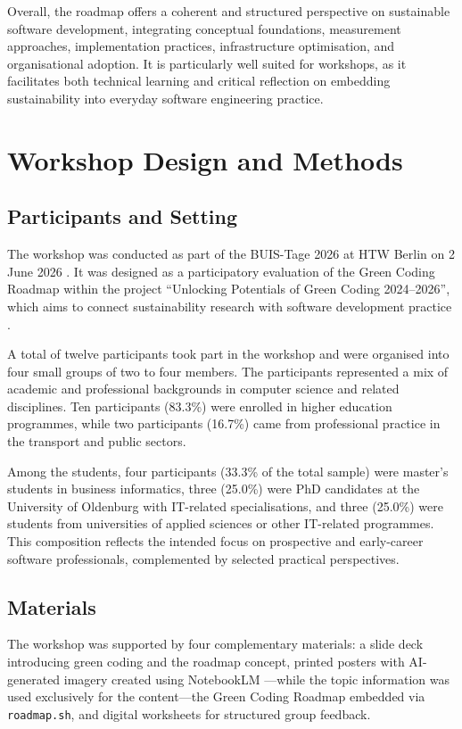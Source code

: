 \documentclass[english]{lni}
\begin{document}
Overall, the roadmap offers a coherent and structured perspective on sustainable software development, integrating conceptual foundations, measurement approaches, implementation practices, infrastructure optimisation, and organisational adoption. It is particularly well suited for workshops, as it facilitates both technical learning and critical reflection on embedding sustainability into everyday software engineering practice.


\section{Workshop Design and Methods}

\subsection{Participants and Setting}
The workshop was conducted as part of the BUIS-Tage 2026 at HTW Berlin on 2 June 2026 \cite{buis_tage_2026}. It was designed as a participatory evaluation of the Green Coding Roadmap within the project \enquote{Unlocking Potentials of Green Coding 2024--2026}, which aims to connect sustainability research with software development practice \cite{junger_2026_workshop}.

A total of twelve participants took part in the workshop and were organised into four small groups of two to four members. The participants represented a mix of academic and professional backgrounds in computer science and related disciplines. Ten participants (83.3\%) were enrolled in higher education programmes, while two participants (16.7\%) came from professional practice in the transport and public sectors.

Among the students, four participants (33.3\% of the total sample) were master's students in business informatics, three (25.0\%) were PhD candidates at the University of Oldenburg with IT-related specialisations, and three (25.0\%) were students from universities of applied sciences or other IT-related programmes. This composition reflects the intended focus on prospective and early-career software professionals, complemented by selected practical perspectives.




\subsection{Materials}

The workshop was supported by four complementary materials: a slide deck introducing green coding and the roadmap concept, printed posters with AI-generated imagery created using NotebookLM \cite{GNotebookLM}—while the topic information was used exclusively for the content—the Green Coding Roadmap embedded via \texttt{roadmap.sh}, and digital worksheets for structured group feedback.
\end{document}
